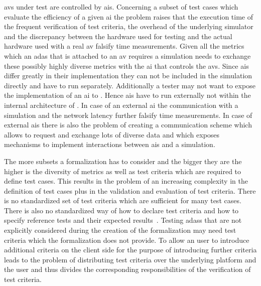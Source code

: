 \Glspl{av} under test are controlled by \glspl{ai}.
Concerning a subset of test cases which evaluate the efficiency of a given \gls{ai} the problem raises that the execution time of the frequent verification of test criteria, the overhead of the underlying simulator and the discrepancy between the hardware used for testing and the actual hardware used with a real \gls{av} falsify time measurements.
Given all the metrics which an \gls{adas} that is attached to an \gls{av} requires a simulation needs to exchange these possibly highly diverse metrics with the \gls{ai} that controls the \glspl{av}.
Since \glspl{ai} differ greatly in their implementation they can not be included in the simulation directly and have to run separately.
Additionally a tester may not want to expose the implementation of an \gls{ai} to \drivebuild{}.
Hence \glspl{ai} have to run externally \ie{} not within the internal architecture of \drivebuild{}.
In case of an external \gls{ai} the communication with a simulation and the network latency further falsify time measurements.
In case of external \glspl{ai} there is also the problem of creating a communication scheme which allows to request and exchange lots of diverse data and which exposes mechanisms to implement interactions between \glspl{ai} and a simulation.\par

The more subsets a formalization has to consider and the bigger they are the higher is the diversity of metrics as well as test criteria which are required to define test cases.
This results in the problem of an increasing complexity in the definition of test cases plus in the validation and evaluation of test criteria.
There is no standardized set of test criteria which are sufficient for many test cases.
There is also no standardized way of how to declare test criteria and how to specify reference tests and their expected results~\cite{noStandard}.
Testing \glspl{adas} that are not explicitly considered during the creation of the formalization may need test criteria which the formalization does not provide.
To allow an user to introduce additional criteria on the client side for the purpose of introducing further criteria leads to the problem of distributing test criteria over the underlying platform and the user and thus divides the corresponding responsibilities of the verification of test criteria.\par


